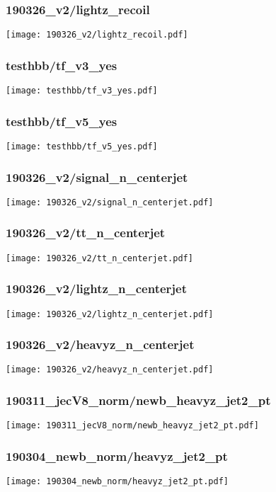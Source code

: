 \begin{frame}
   \frametitle{\small 190326\_v2/lightz\_recoil}
   \centering
   \texttt{[image: 190326\_v2/lightz\_recoil.pdf]}
\end{frame}

\begin{frame}
   \frametitle{\small testhbb/tf\_v3\_yes}
   \centering
   \texttt{[image: testhbb/tf\_v3\_yes.pdf]}
\end{frame}

\begin{frame}
   \frametitle{\small testhbb/tf\_v5\_yes}
   \centering
   \texttt{[image: testhbb/tf\_v5\_yes.pdf]}
\end{frame}

\begin{frame}
   \frametitle{\small 190326\_v2/signal\_n\_centerjet}
   \centering
   \texttt{[image: 190326\_v2/signal\_n\_centerjet.pdf]}
\end{frame}

\begin{frame}
   \frametitle{\small 190326\_v2/tt\_n\_centerjet}
   \centering
   \texttt{[image: 190326\_v2/tt\_n\_centerjet.pdf]}
\end{frame}

\begin{frame}
   \frametitle{\small 190326\_v2/lightz\_n\_centerjet}
   \centering
   \texttt{[image: 190326\_v2/lightz\_n\_centerjet.pdf]}
\end{frame}

\begin{frame}
   \frametitle{\small 190326\_v2/heavyz\_n\_centerjet}
   \centering
   \texttt{[image: 190326\_v2/heavyz\_n\_centerjet.pdf]}
\end{frame}

\begin{frame}
   \frametitle{\small 190311\_jecV8\_norm/newb\_heavyz\_jet2\_pt}
   \centering
   \texttt{[image: 190311\_jecV8\_norm/newb\_heavyz\_jet2\_pt.pdf]}
\end{frame}

\begin{frame}
   \frametitle{\small 190304\_newb\_norm/heavyz\_jet2\_pt}
   \centering
   \texttt{[image: 190304\_newb\_norm/heavyz\_jet2\_pt.pdf]}
\end{frame}

